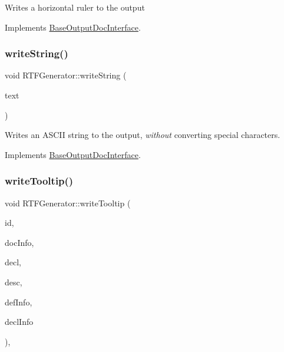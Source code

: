Writes a horizontal ruler to the output 

Implements \mbox{\hyperlink{class_base_output_doc_interface_ade0d004fb6e8641c92f2f144d7242f0b}{Base\+Output\+Doc\+Interface}}.

\mbox{\label{class_r_t_f_generator_ace3fd5e7a703cbae0272372d7e55083b}} 
\subsubsection{\texorpdfstring{writeString()}{writeString()}}
{\footnotesize\ttfamily void R\+T\+F\+Generator\+::write\+String (\begin{DoxyParamCaption}\item[{const char $\ast$}]{text }\end{DoxyParamCaption})\hspace{0.3cm}{\ttfamily [virtual]}}

Writes an A\+S\+C\+II string to the output, {\itshape without} converting special characters. 

Implements \mbox{\hyperlink{class_base_output_doc_interface_a5737513ddf260787b5b79c84ae1059af}{Base\+Output\+Doc\+Interface}}.

\mbox{\label{class_r_t_f_generator_a06e0455dd78d9d79ea51e6d31e6877fe}} 
\subsubsection{\texorpdfstring{writeTooltip()}{writeTooltip()}}
{\footnotesize\ttfamily void R\+T\+F\+Generator\+::write\+Tooltip (\begin{DoxyParamCaption}\item[{const char $\ast$}]{id,  }\item[{const \mbox{\hyperlink{struct_doc_link_info}{Doc\+Link\+Info}} \&}]{doc\+Info,  }\item[{const char $\ast$}]{decl,  }\item[{const char $\ast$}]{desc,  }\item[{const \mbox{\hyperlink{struct_source_link_info}{Source\+Link\+Info}} \&}]{def\+Info,  }\item[{const \mbox{\hyperlink{struct_source_link_info}{Source\+Link\+Info}} \&}]{decl\+Info }\end{DoxyParamCaption})\hspace{0.3cm}{\ttfamily [inline]}, {\ttfamily [virtual]}}

